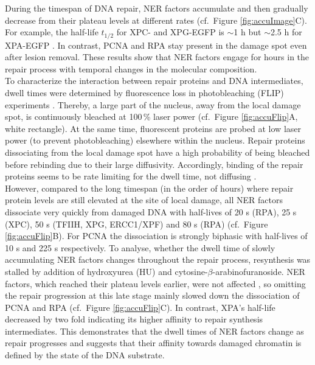 During the timespan of DNA repair, NER factors accumulate and then gradually decrease from their plateau levels at different rates (cf.\ Figure \ref{fig:accuImage}C). For example, the half-life $t_\text{1/2}$ for XPC- and XPG-EGFP is $\sim$1 h but $\sim$2.5 h for XPA-EGFP \cite{Luijsterburg2010}. In contrast, PCNA and RPA stay present in the damage spot even after lesion removal. These results show that NER factors engage for hours in the repair process with temporal changes in the molecular composition.\\
To characterize the interaction between repair proteins and DNA intermediates, dwell times were determined by fluorescence loss in photobleaching (FLIP) experiments \cite{Luijsterburg2010}. Thereby, a large part of the nucleus, away from the local damage spot, is continuously bleached at 100\,\% laser power (cf.\ Figure \ref{fig:accuFlip}A, white rectangle). At the same time, fluorescent proteins are probed at low laser power (to prevent photobleaching) elsewhere within the nucleus. Repair proteins dissociating from the local damage spot have a high probability of being bleached before rebinding due to their large diffusivity. Accordingly, binding of the repair proteins seems to be rate limiting for the dwell time, not diffusing \cite{Luijsterburg2010}.\\
However, compared to the long timespan (in the order of hours) where repair protein levels are still elevated at the site of local damage, all NER factors dissociate very quickly from damaged DNA with half-lives of 20 s (RPA), 25 s (XPC), 50 s (TFIIH, XPG, ERCC1/XPF) and 80 s (RPA) (cf.\ Figure \ref{fig:accuFlip}B). For PCNA the dissociation is strongly biphasic with half-lives of 10 s and 225 s respectively. To analyse, whether the dwell time of slowly accumulating NER factors changes throughout the repair process, resynthesis was stalled by addition of hydroxyurea (HU) and cytosine-$\beta$-arabinofuranoside. NER factors, which reached their plateau levels earlier, were not affected \cite{Luijsterburg2010}, so omitting the repair progression at this late stage mainly slowed down the dissociation of PCNA and RPA (cf.\ Figure \ref{fig:accuFlip}C). In contrast, XPA's half-life decreased by two fold indicating its higher affinity to repair synthesis intermediates. This demonstrates that the dwell times of NER factors change as repair progresses and suggests that their affinity towards damaged chromatin is defined by the state of the DNA substrate.      
           
